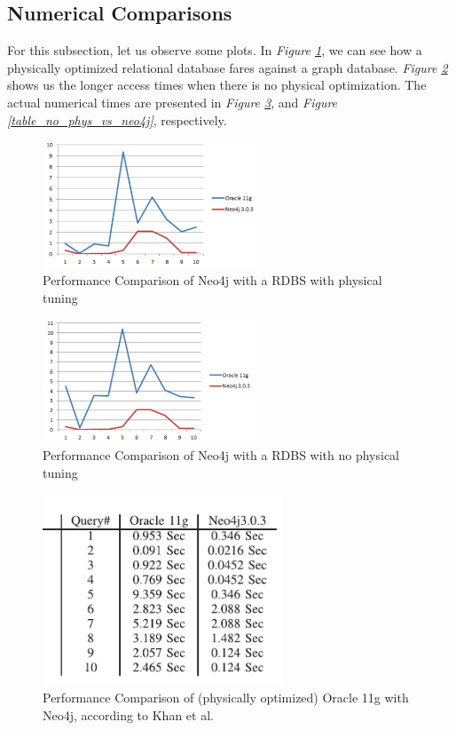 \documentclass[10pt,        %
               a4paper,     %
               journal,     %
               ]{IEEEtran}
\begin{document}
\subsection{Numerical Comparisons}
For this subsection, let us observe some plots. In \textit{Figure \ref{graph_phys_vs_neo4j}}, we can see how a physically optimized relational database fares against a graph database. \textit{Figure \ref{graph_no_phys_vs_neo4j}} shows us the longer access times when there is no physical optimization. The actual numerical times are presented in \textit{Figure \ref{table_phys_vs_neo4j}}, and \textit{Figure \ref{table_no_phys_vs_neo4j}}, respectively. \par
\begin{figure}[!t]
	\centering
	\includegraphics[width=2.5in]{plots/phys_vs_neo4j}
	\caption{Performance Comparison of Neo4j with a RDBS with physical tuning \cite{IEEEpaper1:comparison}}
	\label{graph_phys_vs_neo4j}
\end{figure}

\begin{figure}[!t]
	\centering
	\includegraphics[width=2.5in]{plots/no phys vs neo4j}
	\caption{Performance Comparison of Neo4j with a RDBS with no physical tuning \cite{IEEEpaper1:comparison}}
	\label{graph_no_phys_vs_neo4j}
\end{figure}

\begin{figure}[!t]
	\centering
	\includegraphics[width=2.8in]{plots/phys vs neo4j table}
	\caption{Performance Comparison of (physically optimized) Oracle 11g with Neo4j, according to Khan et al. \cite{IEEEpaper1:comparison}}
	\label{table_phys_vs_neo4j}
\end{figure}
\end{document}
